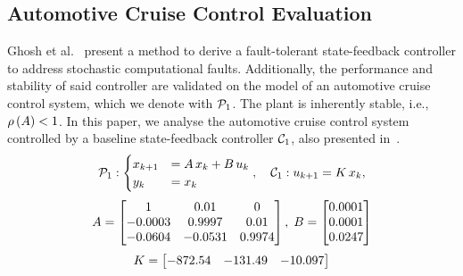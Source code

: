 \subsection{Automotive Cruise Control Evaluation}%
\label{sec:samarjit}

Ghosh et al.~\cite{Ghosh:2018} present a method to derive a fault-tolerant state-feedback controller to address stochastic computational faults.
Additionally, the performance and stability of said controller are validated on the model of an automotive cruise control system, which we denote with $\mathcal{P}_1$.
The plant is inherently stable, i.e., $\rho\left( A \right) < 1$.
In this paper, we analyse the automotive cruise control system controlled by a baseline state-feedback controller $\mathcal{C}_1$, also presented in~\cite{Ghosh:2018}.
%
\begin{equation*}%
    \plant_1: \begin{cases}
        x_{k+1} &= \Ap\,x_k+\Bp\, u_k\\
        y_k &= x_k
    \end{cases}, \quad
    \ctrler_1: u_{k+1} = \Dc\,x_k,
\end{equation*}
\begin{equation*}
    A = \begin{bmatrix}
        1 & 0.01 & 0 \\
        -0.0003 & 0.9997 & 0.01 \\
        -0.0604 & -0.0531 & 0.9974
    \end{bmatrix}, \; B = \begin{bmatrix}
        0.0001 \\
        0.0001 \\
        0.0247
    \end{bmatrix}
\end{equation*}
\begin{equation*}%
    \Dc = \begin{bmatrix}
        -872.54 & -131.49 & -10.097
    \end{bmatrix}
\end{equation*}

